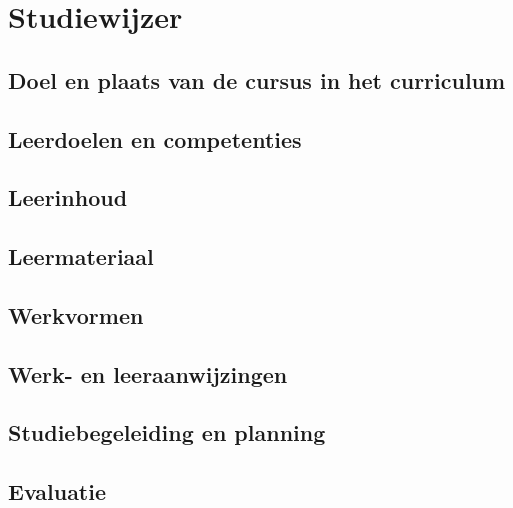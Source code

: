 \chapter{Studiewijzer}%
\label{ch:studiewijzer}

\lipsum[1-2]

\section{Doel en plaats van de cursus in het curriculum}%
\label{sec:doel-en-plaats}

\lipsum[3-4]

\section{Leerdoelen en competenties}%
\label{sec:leerdoelen}

\lipsum[5-6]

\section{Leerinhoud}%
\label{sec:leerinhoud}

\lipsum[7-9]

\section{Leermateriaal}%
\label{sec:leermateriaal}

\lipsum[10-12]

\section{Werkvormen}%
\label{sec:werkvormen}

\lipsum[13]

\section{Werk- en leeraanwijzingen}%
\label{sec:werk-en-leeraanwijzingen}

\lipsum[14]

\section{Studiebegeleiding en planning}%
\label{sec:studiebegeleiding-en-planning}

\lipsum[15]

\section{Evaluatie}%
\label{sec:evaluatie}

\lipsum[16-18]

